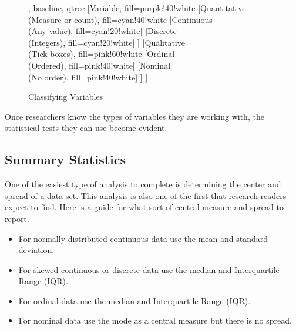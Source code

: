 \begin{figure}[H]
	\centering

		
	\begin{forest}, baseline, qtree
		[Variable, fill=purple!40!white
			[{Quantitative\\(Measure or count)}, fill=cyan!40!white
				[{Continuous\\(Any value)}, fill=cyan!20!white]
				[{Discrete\\(Integers)}, fill=cyan!20!white]
			]
			[{Qualitative\\(Tick boxes)}, fill=pink!60!white
				[{Ordinal\\(Ordered)}, fill=pink!40!white]
				[{Nominal\\(No order)}, fill=pink!40!white]
			]
		]
	\end{forest}

	\caption{Classifying Variables}
	\label{fig06.08}
\end{figure}

Once researchers know the types of variables they are working with, the statistical tests they can use become evident.

\subsection{Summary Statistics}

One of the easiest type of analysis to complete is determining the center and spread of a data set. This analysis is also one of the first that research readers expect to find. Here is a guide for what sort of central measure and spread to report.

\begin{itemize}
	\item For normally distributed continuous data use the mean and standard deviation.
	\item For skewed continuous or discrete data use the median and Interquartile Range (IQR).
	\item For ordinal data use the median and Interquartile Range (IQR).
	\item For nominal data use the mode as a central measure but there is no spread.
\end{itemize}

